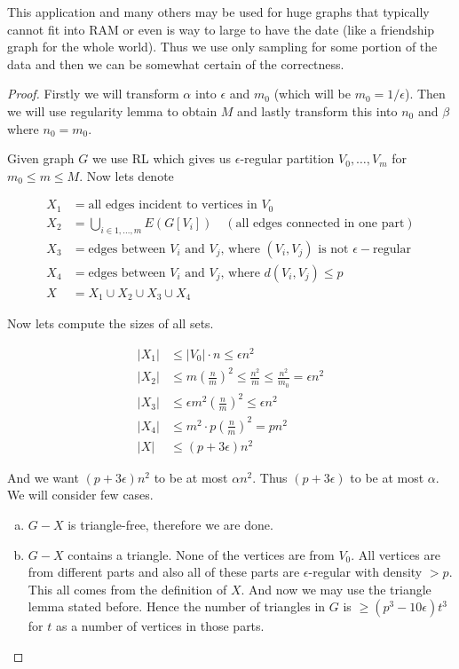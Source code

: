 This application and many others may be used for huge graphs that typically cannot fit into RAM or even is way to large to have the date (like a friendship graph for the whole world). Thus we use only sampling for some portion of the data and then we can be somewhat certain of the correctness.

\begin{proof}
	Firstly we will transform $\alpha$ into $\epsilon$ and $m_0$ (which will be $m_0 = 1/\epsilon$). Then we will use regularity lemma to obtain $M$ and lastly transform this into $n_0$ and $\beta$ where $n_0 = m_0$.
	
	Given graph $G$ we use RL which gives us $\epsilon$-regular partition $V_0, \dots, V_m$ for $m_0 \leq m \leq M$. Now lets denote
	
	$$
	\begin{aligned}
		X_1 &= \text{all edges incident to vertices in } V_0 \\
		X_2 &= \bigcup_{i \in 1, \dots, m} E(G[V_{i}]) \quad (\text{all edges connected in one part})\\
		X_3 &= \text{edges between } V_i \text{ and } V_j \text{, where } (V_i, V_j) \text{ is not } \epsilon-\text{regular} \\
		X_4 &= \text{edges between } V_i \text{ and } V_j \text{, where } d(V_i, V_j) \leq p \\
		X &= X_1 \cup X_2 \cup X_3 \cup X_4
	\end{aligned}
	$$
	
	Now lets compute the sizes of all sets.
	
	$$
	\begin{aligned}
		|X_1| &\leq |V_0| \cdot n \leq \epsilon n^2 \\
		|X_2| &\leq m \left( \frac{n}{m} \right)^2 \leq \frac{n^2}{m} \leq \frac{n^2}{m_0} = \epsilon n^2 \\
		|X_3| &\leq \epsilon m^2 \left( \frac{n}{m} \right)^2 \leq \epsilon n^2 \\
		|X_4| &\leq m^2 \cdot p \left( \frac{n}{m} \right)^2 = p n^2\\
		|X| &\leq (p + 3\epsilon) n^2
	\end{aligned}
	$$
	
	And we want $(p + 3\epsilon) n^2$ to be at most $\alpha n^2$. Thus $(p + 3\epsilon)$ to be at most $\alpha$. We will consider few cases.
	
	\begin{enumerate}[(a)]
		\item $G-X$ is triangle-free, therefore we are done.
		\item $G-X$ contains a triangle. None of the vertices are from $V_0$. All vertices are from different parts and also all of these parts are $\epsilon$-regular with density $> p$. This all comes from the definition of $X$. And now we may use the triangle lemma stated before. Hence the number of triangles in $G$ is $\geq (p^3 - 10\epsilon) t^3$ for $t$ as a number of vertices in those parts.
		

\end{enumerate}
\end{proof}
